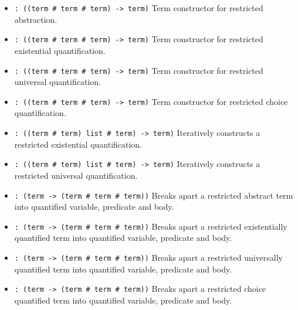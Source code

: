 \begin{itemize}
\item {} \verb|: ((term # term # term) -> term)|\newline
Term constructor for restricted abstraction.

\item {} \verb|: ((term # term # term) -> term)|\newline
Term constructor for restricted existential quantification.

\item {} \verb|: ((term # term # term) -> term)|\newline
Term constructor for restricted universal quantification.

\item {} \verb|: ((term # term # term) -> term)|\newline
Term constructor for restricted choice quantification.

\item {} \verb|: ((term # term) list # term) -> term)|\newline
Iteratively constructs a restricted existential quantification.

\item {} \verb|: ((term # term) list # term) -> term)|\newline
Iteratively constructs a restricted universal quantification.

\item {} \verb|: (term -> (term # term # term))|\newline
Breaks apart a restricted abstract term into
quantified variable, predicate and body.

\item {} \verb|: (term -> (term # term # term))|\newline
Breaks apart a restricted existentially quantified term into
quantified variable, predicate and body.

\item {} \verb|: (term -> (term # term # term))|\newline
Breaks apart a restricted universally quantified term into
quantified variable, predicate and body.

\item {} \verb|: (term -> (term # term # term))|\newline
Breaks apart a restricted choice quantified term into
quantified variable, predicate and body.


\end{itemize}
